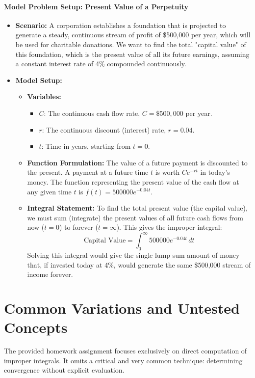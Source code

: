 \documentclass{article}
\begin{document}
\subsection{Model Problem Setup: Present Value of a Perpetuity}
\begin{itemize}
    \item \textbf{Scenario:} A corporation establishes a foundation that is projected to generate a steady, continuous stream of profit of \$500,000 per year, which will be used for charitable donations. We want to find the total "capital value" of this foundation, which is the present value of all its future earnings, assuming a constant interest rate of 4\% compounded continuously.
    \item \textbf{Model Setup:}
    \begin{itemize}
        \item \textbf{Variables:}
        \begin{itemize}
            \item $C$: The continuous cash flow rate, $C = \$500,000$ per year.
            \item $r$: The continuous discount (interest) rate, $r = 0.04$.
            \item $t$: Time in years, starting from $t=0$.
        \end{itemize}
        \item \textbf{Function Formulation:} The value of a future payment is discounted to the present. A payment at a future time $t$ is worth $C e^{-rt}$ in today's money. The function representing the present value of the cash flow at any given time $t$ is $f(t) = 500000 e^{-0.04t}$.
        \item \textbf{Integral Statement:} To find the total present value (the capital value), we must sum (integrate) the present values of all future cash flows from now ($t=0$) to forever ($t=\infty$). This gives the improper integral:
        \[ \text{Capital Value} = \int_{0}^{\infty} 500000 e^{-0.04t} \,dt \]
        Solving this integral would give the single lump-sum amount of money that, if invested today at 4\%, would generate the same \$500,000 stream of income forever.
    \end{itemize}
\end{itemize}

\part{Common Variations and Untested Concepts}
The provided homework assignment focuses exclusively on direct computation of improper integrals. It omits a critical and very common technique: determining convergence without explicit evaluation.
\end{document}
